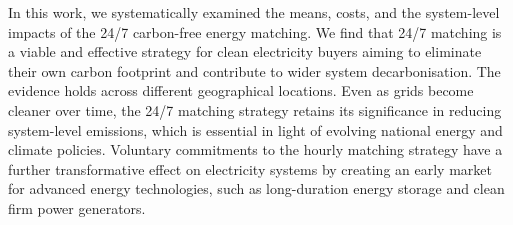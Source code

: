 %

In this work, we systematically examined the means, costs, and the system-level impacts of the 24/7 carbon-free energy matching.
We find that 24/7 matching is a viable and effective strategy for clean electricity buyers aiming to eliminate their own carbon footprint and contribute to wider system decarbonisation.
The evidence holds across different geographical locations.
Even as grids become cleaner over time, the 24/7 matching strategy retains its significance in reducing system-level emissions, which is essential in light of evolving national energy and climate policies.
Voluntary commitments to the hourly matching strategy have a further transformative effect on electricity systems by creating an early market for advanced energy technologies, such as long-duration energy storage and clean firm power generators.